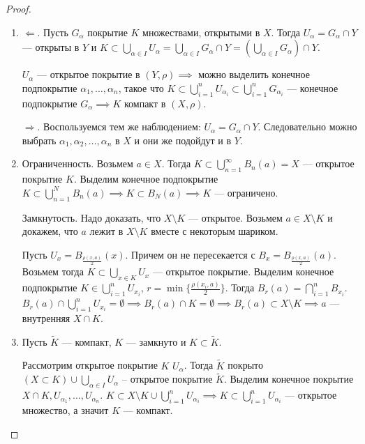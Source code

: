\begin{proof}
    \begin{enumerate}
        \item $\Leftarrow$. Пусть  $G_\alpha$ покрытие  $K$ множествами, открытыми в $X$. Тогда  $U_\alpha = G_\alpha \cap Y$ --- открыты в  $Y$ и $K \subset \bigcup_{\alpha \in I} U_\alpha = \bigcup_{\alpha \in I} G_\alpha \cap Y = (\bigcup_{\alpha \in I} G_\alpha) \cap Y$.

             $U_\alpha$ --- открытое покрытие в  $(Y, \rho) \implies$ можно выделить конечное подпокрытие  $\alpha_1, \ldots, \alpha_n$, такое что $K \subset \bigcup\limits_{i=1}^n U_{\alpha_i} \subset \bigcup\limits_{i=1}^n G_{\alpha_i}$ --- конечное подпокрытие $G_\alpha \implies K$ компакт в  $(X, \rho)$.

              $\Rightarrow$. Воспользуемся тем же наблюдением: $U_\alpha = G_\alpha \cap Y$. Следовательно можно выбрать  $\alpha_1, \alpha_2, \ldots, \alpha_n$ в $X$ и они же подойдут и в  $Y$. 
          \item Ограниченность. Возьмем $a \in X$. Тогда  $K \subset \bigcup\limits_{n=1}^\infty B_n(a) = X$ --- открытое покрытие  $K$. Выделим конечное подпокрытие  $K \subset \bigcup\limits_{n=1}^N B_n(a) \implies K \subset B_N(a) \implies K$ --- ограничено. 

              Замкнутость. Надо доказать, что $X \setminus K$ --- открытое. Возьмем  $a \in X \setminus K$ и докажем, что  $a$ лежит в  $X \setminus K$ вместе с некоторым шариком. 

              Пусть  $U_x = B_{\frac{\rho(x, a)}{2}}(x)$. Причем он не пересекается с $B_x = B_{\frac{\rho(x, a)}{2}}(a)$. Возьмем тогда $K \subset \bigcup_{x \in K} U_x$ --- открытое покрытие. Выделим конечное подпокрытие  $K \in \bigcup\limits_{i=1}^n U_{x_i}$,  $r = \min\{\frac{\rho(x_i, a)}{2} \}$. Тогда $B_r(a) = \bigcap\limits_{i=1}^n B_{x_i}$.  $B_r(a) \cap \bigcup\limits_{i=1}^n U_{x_i} = \emptyset \implies B_r(a) \cap K = \emptyset \implies B_r(a) \subset X \setminus K \implies a$ --- внутренняя $X \cap K$.
          \item Пусть $\widetilde{K}$ --- компакт,  $K$ --- замкнуто и  $K \subset \widetilde{K}$.

              Рассмотрим открытое покрытие  $K$  $U_\alpha$. Тогда  $\widetilde{K}$ покрыто  $(X \subset K) \cup \bigcup\limits_{\alpha \in I} U_\alpha$ -- открытое покрытие  $\widetilde{K}$. Выделим конечное покрытие  $X \cap K, U_{\alpha_1}, \ldots, U_{\alpha_n}$. $K \subset X \setminus K \cup \bigcup\limits_{i=1}^n U_{\alpha_i} \implies K \subset \bigcup\limits_{i=1}^n U_{\alpha_i}$ --- открытое множество, а значит  $K$ --- компакт.
    \end{enumerate}
\end{proof}
